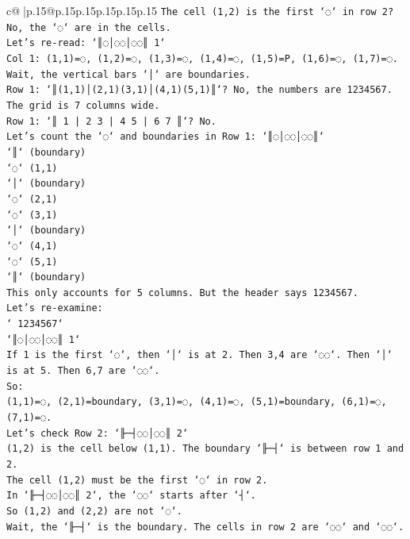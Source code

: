 \documentclass{article}
\begin{document}
{\begin{supertabular}{c@{$\;$}|p{.15\linewidth}@{}p{.15\linewidth}p{.15\linewidth}p{.15\linewidth}p{.15\linewidth}p{.15\linewidth}}
{{{\texttt{The cell (1,2) is the first `◌` in row 2? No, the `◌` are in the cells.} \\
\texttt{Let's re{-}read: `║◌│◌◌│◌◌║ 1`} \\
\texttt{Col 1: (1,1)=◌, (1,2)=◌, (1,3)=◌, (1,4)=◌, (1,5)=P, (1,6)=◌, (1,7)=◌.} \\
\texttt{Wait, the vertical bars `│` are boundaries.} \\
\texttt{Row 1: `║(1,1)│(2,1)(3,1)│(4,1)(5,1)║`? No, the numbers are 1234567.} \\
\texttt{The grid is 7 columns wide.} \\
\texttt{Row 1: `║ 1 | 2 3 | 4 5 | 6 7 ║`? No.} \\
\texttt{Let's count the `◌` and boundaries in Row 1: `║◌│◌◌│◌◌║`} \\
\texttt{`║` (boundary)} \\
\texttt{`◌` (1,1)} \\
\texttt{`│` (boundary)} \\
\texttt{`◌` (2,1)} \\
\texttt{`◌` (3,1)} \\
\texttt{`│` (boundary)} \\
\texttt{`◌` (4,1)} \\
\texttt{`◌` (5,1)} \\
\texttt{`║` (boundary)} \\
\texttt{This only accounts for 5 columns. But the header says 1234567.} \\
\texttt{Let's re{-}examine:} \\
\texttt{` 1234567`} \\
\texttt{`║◌│◌◌│◌◌║ 1`} \\
\texttt{If 1 is the first `◌`, then `│` is at 2. Then 3,4 are `◌◌`. Then `│` is at 5. Then 6,7 are `◌◌`.} \\
\texttt{So:} \\
\texttt{(1,1)=◌, (2,1)=boundary, (3,1)=◌, (4,1)=◌, (5,1)=boundary, (6,1)=◌, (7,1)=◌.} \\
\texttt{Let's check Row 2: `╟─┤◌◌│◌◌║ 2`} \\
\texttt{(1,2) is the cell below (1,1). The boundary `╟─┤` is between row 1 and 2.} \\
\texttt{The cell (1,2) must be the first `◌` in row 2.} \\
\texttt{In `╟─┤◌◌│◌◌║ 2`, the `◌◌` starts after `┤`.} \\
\texttt{So (1,2) and (2,2) are not `◌`.} \\
\texttt{Wait, the `╟─┤` is the boundary. The cells in row 2 are `◌◌` and `◌◌`.} \\
}}}
\end{supertabular}}
\end{document}
